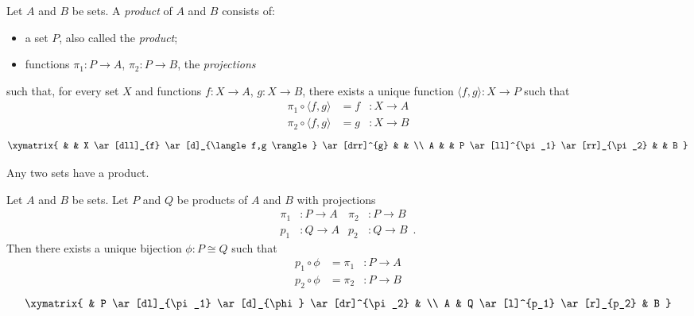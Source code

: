 \begin{df}[Product]
  Let $A$ and $B$ be sets. A \emph{product} of $A$ and $B$ consists of:
  \begin{itemize}
    \item a set $P$, also called the \emph{product};
    \item functions $\pi_1 : P \rightarrow A$, $\pi_2 : P \rightarrow B$, the 
    \emph{projections}
  \end{itemize}
  such that, for every set $X$ and functions $f : X \rightarrow A$, $g : X 
  \rightarrow B$, there exists a unique function $\langle f, g \rangle : X 
  \rightarrow P$ such that
  \begin{align*}
    \pi_1 \circ \langle f, g \rangle & = f & : X \rightarrow A \\
    \pi_2 \circ \langle f, g \rangle & = g & : X \rightarrow B
  \end{align*}
  \[ \xymatrix{
    & & X \ar[dll]_{f} \ar[d]_{\langle f,g \rangle} \ar[drr]^{g} & & \\
    A & & P \ar[ll]^{\pi_1} \ar[rr]_{\pi_2} & & B
  } \]
\end{df}

\begin{ax}[Products]
  Any two sets have a product.
\end{ax}

\begin{thm}
  Let $A$ and $B$ be sets. Let $P$ and $Q$ be products of $A$ and $B$ with 
  projections
  \begin{align*}
    \pi_1 & : P \rightarrow A & \pi_2 & : P \rightarrow B \\
    p_1 & : Q \rightarrow A & p_2 & : Q \rightarrow B \enspace .
  \end{align*}
  Then there exists a unique bijection $\phi : P \cong Q$ such that
  \begin{align*}
    p_1 \circ \phi & = \pi_1 & : P \rightarrow A \\
    p_2 \circ \phi & = \pi_2 & : P \rightarrow B
  \end{align*}
  \[ \xymatrix{
    & P \ar[dl]_{\pi_1} \ar[d]_{\phi} \ar[dr]^{\pi_2} & \\
    A & Q \ar[l]^{p_1} \ar[r]_{p_2} & B
  } \]
\end{thm}

